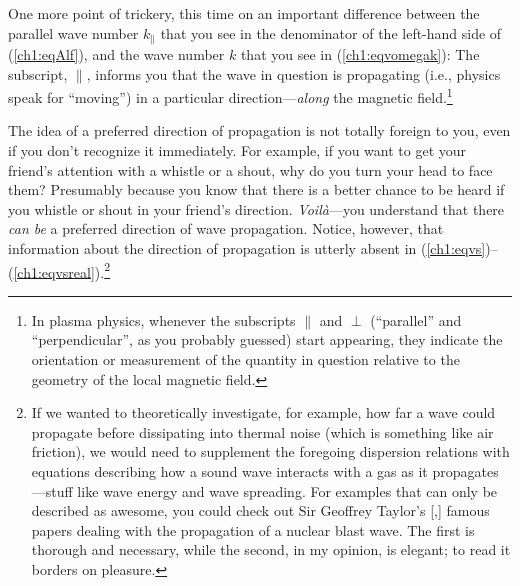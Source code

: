 
One more point of trickery, this time on an important difference between the
parallel wave number $k_\parallel$ that you see in the denominator of the
left-hand side of (\ref{ch1:eqAlf}), and the wave number $k$ that you see in
(\ref{ch1:eqvomegak}): The subscript, $\parallel$, informs you that the wave in
question is propagating (i.e., physics speak for ``moving'') in a particular
direction---\emph{along} the magnetic field.\footnote{In plasma physics,
  whenever the subscripts $\parallel$ and $\perp$ (``parallel'' and
  ``perpendicular'', as you probably guessed) start appearing, they indicate the
  orientation or measurement of the quantity in question relative to the
  geometry of the local magnetic field.}

The idea of a preferred direction of propagation is not totally foreign to you,
even if you don't recognize it immediately. For example, if you want to get your
friend's attention with a whistle or a shout, why do you turn your head to face
them? Presumably because you know that there is a better chance to be heard if
you whistle or shout in your friend's direction. \textit{Voil\`{a}}---you
understand that there \emph{can be} a preferred direction of wave
propagation. Notice, however, that information about the direction of
propagation is utterly absent in
(\ref{ch1:eqvs})--(\ref{ch1:eqvsreal}).\footnote{If we wanted to theoretically
  investigate, for example, how far a wave could propagate before dissipating
  into thermal noise (which is something like air friction), we would need to
  supplement the foregoing dispersion relations with equations describing how a
  sound wave interacts with a gas as it propagates---stuff like wave energy and
  wave spreading. For examples that can only be described as awesome, you could
  check out Sir Geoffrey Taylor's [\citeyear{Taylor1950},\citeyear{Taylor1950a}]
  famous papers dealing with the propagation of a nuclear blast wave. The first
  is thorough and necessary, while the second, in my opinion, is elegant; to
  read it borders on pleasure.}


